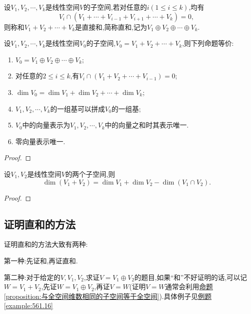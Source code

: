\documentclass[lang=cn,newtx,10pt,scheme=chinese]{elegantbook}
\begin{document}
\begin{definition}[直和]\label{definition:直和}
    设\(V_1,V_2,\cdots,V_k\)是线性空间\(V\)的子空间,若对任意的\(i(1\leq i\leq k)\),均有
    \[
    V_i\cap(V_1+\cdots+V_{i - 1}+V_{i + 1}+\cdots+V_k)=0,
    \]
    则称和\(V_1 + V_2+\cdots+V_k\)是直接和,简称直和,记为\(V_1\oplus V_2\oplus\cdots\oplus V_k\).
    \end{definition}
    
\begin{theorem}[直和的等价条件]\label{theorem:直和的等价条件}
设\(V_1,V_2,\cdots,V_k\)是线性空间\(V_0\)的子空间,\(V_0 = V_1 + V_2+\cdots+V_k\),则下列命题等价:
\begin{enumerate}[(1)]
    \item \label{theorem:直和的等价条件1}\(V_0 = V_1\oplus V_2\oplus\cdots\oplus V_k\);
    \item \label{theorem:直和的等价条件2}对任意的\(2\leq i\leq k\),有\(V_i\cap(V_1 + V_2+\cdots+V_{i - 1}) = 0\);
    \item \label{theorem:直和的等价条件3}\(\dim V_0=\dim V_1+\dim V_2+\cdots+\dim V_k\);
    \item \label{theorem:直和的等价条件4}\(V_1,V_2,\cdots,V_k\)的一组基可以拼成\(V_0\)的一组基;
    \item \label{theorem:直和的等价条件5}\(V_0\)中的向量表示为\(V_1,V_2,\cdots,V_k\)中的向量之和时其表示唯一.
    \item 零向量表示唯一.
\end{enumerate}
\end{theorem}
\begin{proof}
        
\end{proof} 

\begin{theorem}[维数公式]\label{theorem:维数公式}
    设\(V_1,V_2\)是线性空间\(V\)的两个子空间,则
    \[
    \dim(V_1 + V_2)=\dim V_1+\dim V_2-\dim(V_1\cap V_2).
    \]
    \end{theorem}
    \begin{proof}
        
\end{proof}

\subsection{证明直和的方法}
证明直和的方法大致有两种:

第一种:先证和,再证直和. 

第二种:对于给定的\(V,V_1,V_2\),求证\(V = V_1\oplus V_2\)的题目,如果“和”不好证明的话,可以记\(W = V_1 + V_2\),先证\(W = V_1\oplus V_2\),再证\(V = W\)(证明\(V = W\)通常会利用\hyperref[proposition:与全空间维数相同的子空间等于全空间]{命题\ref{proposition:与全空间维数相同的子空间等于全空间}}).具体例子见\hyperref[example:561.16]{例题\ref{example:561.16}}
\end{document}
